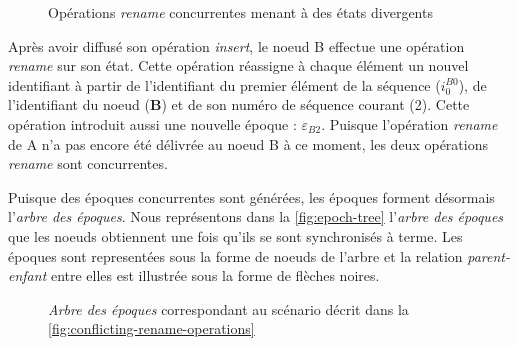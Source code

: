 \documentclass[12pt]{thesul}
\newcommand{\trm}[1]{\mathit{#1}}
\newcommand{\id}[3]{$\trm{#1}^{\trm{#2}}_{\trm{#3}}$}
\newcommand{\epoch}[1]{$\varepsilon_{#1}$}
\begin{document}
\begin{figure}[!ht]
{
  }
  \caption{Opérations \emph{rename} concurrentes menant à des états divergents}
  \label{fig:conflicting-rename-operations}
\end{figure}

Après avoir diffusé son opération \emph{insert}, le noeud B effectue une opération \emph{rename} sur son état.
Cette opération réassigne à chaque élément un nouvel identifiant à partir de l'identifiant du premier élément de la séquence (\id{i}{B0}{0}), de l'identifiant du noeud (\textbf{B}) et de son numéro de séquence courant (2).
Cette opération introduit aussi une nouvelle époque : \epoch{B2}.
Puisque l'opération \emph{rename} de A n'a pas encore été délivrée au noeud B à ce moment, les deux opérations \emph{rename} sont concurrentes.

Puisque des époques concurrentes sont générées, les époques forment désormais l'\emph{arbre des époques}.
Nous représentons dans la \autoref{fig:epoch-tree} l'\emph{arbre des époques} que les noeuds obtiennent une fois qu'ils se sont synchronisés à terme.
Les époques sont representées sous la forme de noeuds de l'arbre et la relation \emph{parent-enfant} entre elles est illustrée sous la forme de flèches noires.

\begin{figure}[!ht]
  \centering
  \caption{\emph{Arbre des époques} correspondant au scénario décrit dans la \autoref{fig:conflicting-rename-operations}}
  \label{fig:epoch-tree}
\end{figure}
\end{document}
